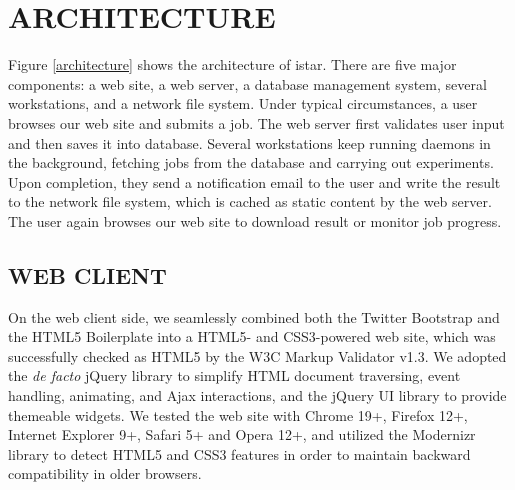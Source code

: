 \documentclass[12pt]{article}
\begin{document}
\section*{\sffamily \Large ARCHITECTURE}

Figure \ref{architecture} shows the architecture of istar. There are five major components: a web site, a web server, a database management system, several workstations, and a network file system. Under typical circumstances, a user browses our web site and submits a job. The web server first validates user input and then saves it into database. Several workstations keep running daemons in the background, fetching jobs from the database and carrying out experiments. Upon completion, they send a notification email to the user and write the result to the network file system, which is cached as static content by the web server. The user again browses our web site to download result or monitor job progress.

\subsection*{\sffamily \large WEB CLIENT}

On the web client side, we seamlessly combined both the Twitter Bootstrap and the HTML5 Boilerplate into a HTML5- and CSS3-powered web site, which was successfully checked as HTML5 by the W3C Markup Validator v1.3. We adopted the \textit{de facto} jQuery library to simplify HTML document traversing, event handling, animating, and Ajax interactions, and the jQuery UI library to provide themeable widgets. We tested the web site with Chrome 19+, Firefox 12+, Internet Explorer 9+, Safari 5+ and Opera 12+, and utilized the Modernizr library to detect HTML5 and CSS3 features in order to maintain backward compatibility in older browsers.
\end{document}
